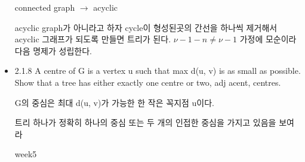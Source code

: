 \documentclass{oblivoir}
\begin{document}
\begin{itemize}
    connected graph $\rightarrow$ acyclic

    acyclic graph가 아니라고 하자 cycle이 형성된곳의 간선을 하나씩 제거해서 acyclic 그래프가 되도록 만들면 트리가 된다.
    $\nu-1-n \neq \nu -1 $ 가정에 모순이라 다음 명제가 성립한다.

    \item  2.1.8
    A centre of G is a vertex u such that max d(u, v) is as small as possible.
    Show that a tree has either exactly one centre or two,
    adj acent, centres.


    G의 중심은 최대 d(u, v)가 가능한 한 작은 꼭지점 u이다.

    트리 하나가 정확히 하나의 중심 또는 두 개의 인접한 중심을 가지고 있음을 보여라

    week5
    \begin{dfn}
        
    \end{dfn}

    
    \end{itemize}
\end{document}
